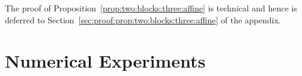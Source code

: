 \documentclass[nohyperref]{article}
\theoremstyle{plain}
\theoremstyle{definition}
\theoremstyle{remark}
\begin{document}
The proof of Proposition~\ref{prop:two:blocks:three:affine} is technical and hence is deferred to Section~\ref{sec:proof:prop:two:blocks:three:affine} of the appendix.




\section{Numerical Experiments}
\label{sec:experiment}




\end{document}
